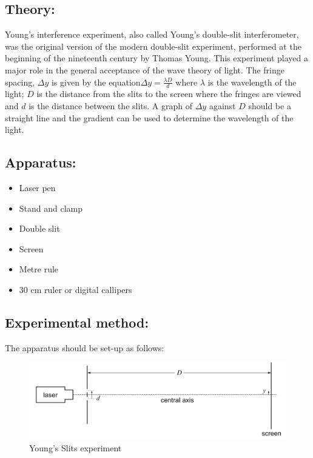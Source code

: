 \documentclass{tufte-handout}
\begin{document}
\subsection{Theory:} Young's interference experiment, also called Young's double-slit interferometer, was the original version of the modern double-slit experiment, performed at the beginning of the nineteenth century by Thomas Young. This experiment played a major role in the general acceptance of the wave theory of light. The fringe spacing, $\Delta y $ is given by the equation$\Delta y = \frac{\lambda D}{d}$ where $\lambda$ is the wavelength of the light; $D$ is the distance from the slits to the screen where the fringes are viewed and $d$ is the distance between the slits.  A graph of $\Delta y$ against $D$ should be a straight line and the gradient can be used to determine the wavelength of the light. 
\subsection{Apparatus:}
\begin{itemize}
\item Laser pen 
\item Stand and clamp 
\item Double slit 
\item Screen 
\item Metre rule 
\item 30 cm ruler or digital callipers
\end{itemize}
\subsection{Experimental method:} 
The apparatus should be set-up as follows:   
\begin{figure}
\includegraphics[width=\textwidth]{youngs.PNG}
\caption{Young's Slits experiment}
\end{figure}
\end{document}
